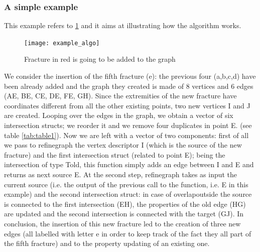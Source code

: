 \documentclass[11pt]{article} %
\begin{document}
		\subsubsection{A simple example}
		This example refers to \ref{fig:example_algo} and it aims at illustrating how the algorithm works.
		\begin{figure}
			\centering 
			\texttt{[image: example\_algo]}
			\caption{Fracture in red is going to be added to the graph}
			\label{fig:example_algo}
		\end{figure}
		We consider the insertion of the fifth fracture (e): the previous four (a,b,c,d) have been already added and the graph they created is made of 8 vertices and 6 edges (AE, BE, CE, DE, FE, GH).  
		Since the extremities of the new fracture have coordinates different from all the other existing points, two new vertices I and J are created. Looping over the edges in the graph, we obtain a vector of six intersection structs; we reorder it and we remove four duplicates in point E.  (see table \ref{tab:table1}).
		Now we are left with a vector of two components: first of all we pass to refine\textunderscore graph the vertex descriptor I (which is the source of the new fracture) and the first intersection struct (related to point E); being the intersection of type T\textunderscore old, this function simply adds an edge between I and E and returns as next source E. At the second step, refine\textunderscore graph takes as input the current source (i.e. the output of the previous call to the function, i.e. E in this example) and the second intersection struct: in case of overlap\textunderscore outside the source is connected to the first intersection (EH), the properties of the old edge (HG) are updated and the second intersection is connected with the target (GJ). In conclusion, the insertion of this new fracture led to the creation of three new edges (all labelled with letter e in order to keep track of the fact they all part of the fifth fracture) and to the property updating of an existing one.
		
\end{document}
